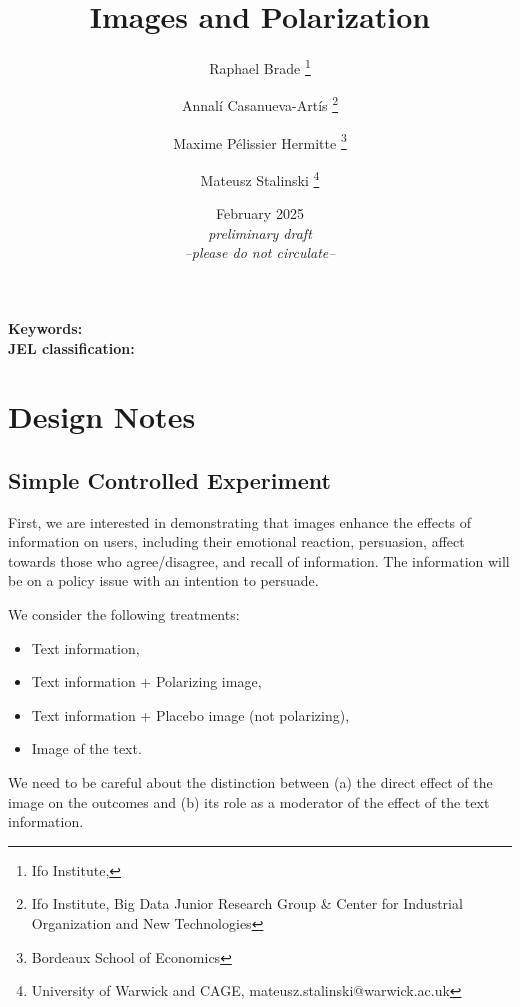 \documentclass[12pt]{article}
\title{Images and Polarization}
\author{Raphael Brade \thanks{\scriptsize{Ifo Institute,}} \and {Annalí Casanueva-Artís \thanks{\scriptsize{Ifo Institute, Big Data Junior Research Group \& Center for Industrial Organization and New Technologies}}} \and {Maxime Pélissier Hermitte \thanks{\scriptsize{Bordeaux School of Economics}}}\and  {Mateusz Stalinski \thanks{\scriptsize{University of Warwick and CAGE, mateusz.stalinski@warwick.ac.uk}}}}
\date{February 2025 \\ \vspace{2cm} \textit{preliminary draft \\ --please do not circulate--}}
\begin{document}
\maketitle


\begin{abstract}
\noindent 


 

\end{abstract}


\textbf{\medskip{}
}

\noindent\textbf{Keywords:} \\
\textbf{JEL classification:} 


\thispagestyle{empty}
\setcounter{page}{0}%
\newpage

\onehalfspacing

\section*{Design Notes}

\subsection*{Simple Controlled Experiment}

First, we are interested in demonstrating that images enhance the effects of information on users, including their emotional reaction, persuasion, affect towards those who agree/disagree, and recall of information. The information will be on a policy issue with an intention to persuade.

\vspace{1em}

\noindent We consider the following treatments:
\begin{itemize}[noitemsep,nolistsep]
    \item Text information,
    \item Text information + Polarizing image,
    \item Text information + Placebo image (not polarizing),
    \item Image of the text.
\end{itemize}

\vspace{1em}

\noindent We need to be careful about the distinction between (a) the direct effect of the image on the outcomes and (b) its role as a moderator of the effect of the text information.
\end{document}
